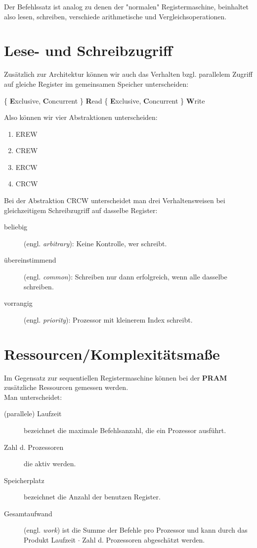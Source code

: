Der Befehlssatz ist analog zu denen der "normalen" Registermaschine, beinhaltet also lesen, schreiben, verschiede arithmetische und Vergleichsoperationen.

\section{Lese- und Schreibzugriff}
Zusätzlich zur Architektur können wir auch das Verhalten bzgl. parallelem Zugriff auf gleiche Register im gemeinsamen Speicher unterscheiden:

\begin{center}
\{ \textbf{E}xclusive, \textbf{C}oncurrent \} \textbf{R}ead \{ \textbf{E}xclusive, \textbf{C}oncurrent \} \textbf{W}rite
\end{center}

Also können wir vier Abstraktionen unterscheiden:

\begin{enumerate}
\item EREW
\item CREW
\item ERCW
\item CRCW
\end{enumerate}

Bei der Abstraktion CRCW unterscheidet man drei Verhaltensweisen bei gleichzeitigem Schreibzugriff auf dasselbe Register:

\begin{description}
\item[beliebig] (engl. \emph{arbitrary}): Keine Kontrolle, wer schreibt.
\item[übereinstimmend] (engl. \emph{common}): Schreiben nur dann erfolgreich, wenn alle dasselbe schreiben.
\item[vorrangig] (engl. \emph{priority}): Prozessor mit kleinerem Index schreibt.
\end{description}

\newpage
\section{Ressourcen/Komplexitätsmaße}
Im Gegensatz zur sequentiellen Registermaschine können bei der \textbf{PRAM} zusätzliche Ressourcen gemessen werden.\\
Man unterscheidet:

\begin{description}
\item[(parallele) Laufzeit] bezeichnet die maximale Befehlsanzahl, die ein Prozessor ausführt.
\item[Zahl d. Prozessoren] die aktiv werden.
\item[Speicherplatz] bezeichnet die Anzahl der benutzen Register.
\item[Gesamtaufwand] (engl. \emph{work}) ist die Summe der Befehle pro Prozessor und kann durch das Produkt Laufzeit $\cdot$ Zahl d. Prozessoren abgeschätzt werden. 
\end{description}

